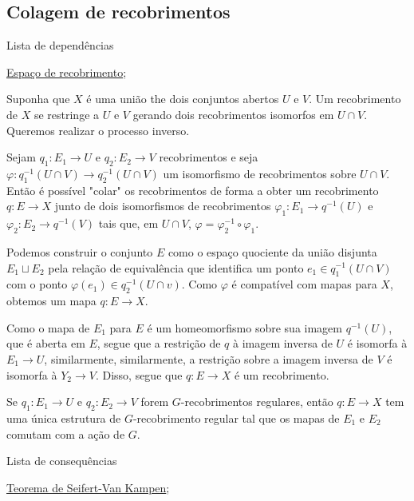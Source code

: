 \subsection{Colagem de recobrimentos}
\label{colagem-de-recobrimentos-prop}
\begin{titlemize}{Lista de dependências}
	\item \hyperref[espaco-de-recobrimento]{Espaço de recobrimento};
\end{titlemize}
Suponha que $X$ é uma união the dois conjuntos abertos $U$ e $V$. Um recobrimento de $X$ se restringe a $U$ e $V$ gerando dois recobrimentos isomorfos em $U \cap V$. Queremos realizar o processo inverso.
\begin{thm} 
	Sejam $q_1: E_1 \longrightarrow U$ e $q_2: E_2 \longrightarrow V$ recobrimentos e seja $\varphi: q_1^{-1}(U \cap V) \longrightarrow q_2^{-1}(U \cap V)$ um isomorfismo de recobrimentos sobre $U \cap V$. Então é possível "colar" os recobrimentos de forma a obter um recobrimento $q:E \longrightarrow X$ junto de dois isomorfismos de recobrimentos $\varphi_1:E_1 \longrightarrow q^{-1}(U)$  e $\varphi_2:E_2 \longrightarrow q^{-1}(V)$ tais que, em $U \cap V$, $\varphi = \varphi_2^{-1} \circ \varphi_1$.
\end{thm}

\begin{dem}
    Podemos construir o conjunto $E$ como o espaço quociente da união disjunta $E_1 \sqcup E_2$ pela relação de equivalência que identifica um ponto $e_1 \in q_1^{-1}(U \cap V)$ com o ponto $\varphi(e_1) \in q_2^{-1}(U \cap v)$. Como $\varphi$ é compatível com mapas para $X$, obtemos um mapa $q:E \longrightarrow X$.

    Como o mapa de $E_1$ para $E$ é um homeomorfismo sobre sua imagem $q^{-1}(U)$, que é aberta em $E$, segue que a restrição de $q$ à imagem inversa de $U$ é isomorfa à $E_1 \longrightarrow U$, similarmente, similarmente, a restrição sobre a imagem inversa de $V$ é isomorfa à $Y_2 \longrightarrow V$. Disso, segue que $q:E \longrightarrow X$ é um recobrimento.
\end{dem}

\begin{corol}
    Se $q_1:E_1 \longrightarrow U$ e $q_2:E_2 \longrightarrow V$ forem $G$-recobrimentos regulares, então $q:E \longrightarrow X$ tem uma única estrutura de $G$-recobrimento regular tal que os mapas de $E_1$ e $E_2$ comutam com a ação de $G$.
\end{corol}

\begin{titlemize}{Lista de consequências}
	\item \hyperref[seifert-van-kampen-prop]{Teorema de Seifert-Van Kampen};
\end{titlemize}